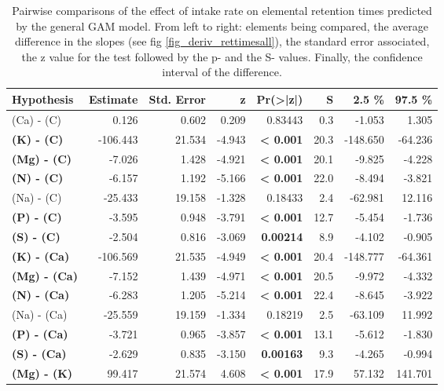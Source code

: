 \begin{table}[H]
\centering
\caption{\label{supptable:table_pairs_d_rt} Pairwise comparisons of the effect of intake rate on elemental retention times predicted by the general GAM model. From left to right: elements being compared, the average difference in the slopes (see fig \ref{fig_deriv_rettimesall}), the standard error associated, the z value for the test followed by the p- and the S- values. Finally, the confidence interval of the difference.}
\centering
\begin{tabular}[t]{>{}lrrr>{}rrrr}
\toprule
\textbf{ Hypothesis  } & \textbf{ Estimate } & \textbf{ Std. Error } & \textbf{ z      } & \textbf{ Pr(>|z|) } & \textbf{ S    } & \textbf{ 2.5 \%    } & \textbf{ 97.5 \%  }\\
\midrule
(Ca) - (C) & 0.126 & 0.602 & 0.209 & 0.83443 & 0.3 & -1.053 & 1.305\\
\textbf{(K) - (C)} & -106.443 & 21.534 & -4.943 & \textbf{< 0.001} & 20.3 & -148.650 & -64.236\\
\textbf{(Mg) - (C)} & -7.026 & 1.428 & -4.921 & \textbf{< 0.001} & 20.1 & -9.825 & -4.228\\
\textbf{(N) - (C)} & -6.157 & 1.192 & -5.166 & \textbf{< 0.001} & 22.0 & -8.494 & -3.821\\
(Na) - (C) & -25.433 & 19.158 & -1.328 & 0.18433 & 2.4 & -62.981 & 12.116\\
\textbf{(P) - (C)} & -3.595 & 0.948 & -3.791 & \textbf{< 0.001} & 12.7 & -5.454 & -1.736\\
\textbf{(S) - (C)} & -2.504 & 0.816 & -3.069 & \textbf{0.00214} & 8.9 & -4.102 & -0.905\\
\textbf{(K) - (Ca)} & -106.569 & 21.535 & -4.949 & \textbf{< 0.001} & 20.4 & -148.777 & -64.361\\
\textbf{(Mg) - (Ca)} & -7.152 & 1.439 & -4.971 & \textbf{< 0.001} & 20.5 & -9.972 & -4.332\\
\textbf{(N) - (Ca)} & -6.283 & 1.205 & -5.214 & \textbf{< 0.001} & 22.4 & -8.645 & -3.922\\
(Na) - (Ca) & -25.559 & 19.159 & -1.334 & 0.18219 & 2.5 & -63.109 & 11.992\\
\textbf{(P) - (Ca)} & -3.721 & 0.965 & -3.857 & \textbf{< 0.001} & 13.1 & -5.612 & -1.830\\
\textbf{(S) - (Ca)} & -2.629 & 0.835 & -3.150 & \textbf{0.00163} & 9.3 & -4.265 & -0.994\\
\textbf{(Mg) - (K)} & 99.417 & 21.574 & 4.608 & \textbf{< 0.001} & 17.9 & 57.132 & 141.701\\

\end{tabular}
\end{table}
